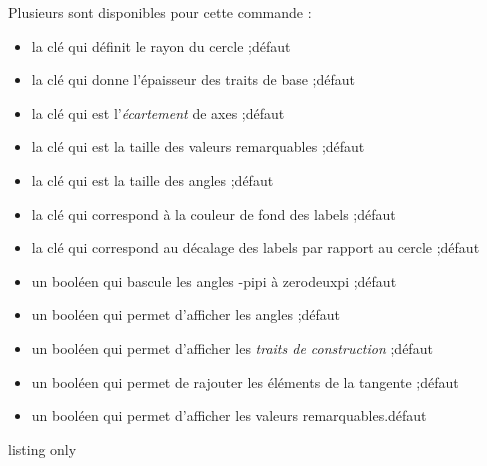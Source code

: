 \begin{cautionblock}
Plusieurs  sont disponibles pour cette commande :

\begin{itemize}
	\item la clé  qui définit le rayon du cercle ;\hfill{}défaut 
	\item la clé  qui donne l'épaisseur des traits de base ;\hfill{}défaut 
	\item la clé  qui est l'\textit{écartement} de axes  ;\hfill{}défaut 
	\item la clé  qui est la taille des valeurs remarquables ;\hfill{}défaut 
	\item la clé  qui est la taille des angles ;\hfill{}défaut 
	\item la clé  qui correspond à la couleur de fond des labels ;\hfill{}défaut 
	\item la clé  qui correspond au décalage des labels par rapport au cercle ;\hfill{}défaut \Cle{10pt}
	\item un booléen  qui bascule les angles \og -pipi \fg{} à \og zerodeuxpi \fg{} ;\hfill{}défaut 
	\item un booléen  qui permet d'afficher les angles ;\hfill{}défaut 
	\item un booléen  qui permet d'afficher les \textit{traits de construction} ;\hfill{}défaut 
	\item un booléen  qui permet de rajouter les éléments de la tangente ;\hfill{}défaut 
	\item un booléen  qui permet d'afficher les valeurs remarquables.\hfill{}défaut 
\end{itemize}
\vspace*{-\baselineskip}\leavevmode
\end{cautionblock}

\pagebreak

\begin{PresCodeTexPL}{listing only}
\begin{center}
\begin{tikzpicture}[line join=bevel]
	\CercleTrigo[Rayon=2.5,AffValeurs=false,Decal=8pt]
\end{tikzpicture}
~~~~
\begin{tikzpicture}[line join=bevel]
	\CercleTrigo[Rayon=2.5,AffAngles=false]
\end{tikzpicture}
~~~~
\begin{tikzpicture}[line join=bevel]
	\CercleTrigo[Rayon=2.5,MoinsPi=false,CouleurFond=orange!15]
\end{tikzpicture}
\end{center}
\end{PresCodeTexPL}

